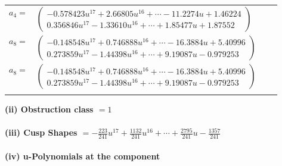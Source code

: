 \documentclass[1p]{elsarticle_modified}
\theoremstyle{definition}
\begin{document}
\begin{tabular}{m{7pt} m{180pt} m{7pt} m{180pt} }
\flushright $a_{4}=$&$\begin{pmatrix}-0.578423 u^{17}+2.66805 u^{16}+\cdots-11.2274 u+1.46224\\0.356846 u^{17}-1.33610 u^{16}+\cdots+1.85477 u+1.87552\end{pmatrix}$ \\
\flushright $a_{8}=$&$\begin{pmatrix}-0.148548 u^{17}+0.746888 u^{16}+\cdots-16.3884 u+5.40996\\0.273859 u^{17}-1.44398 u^{16}+\cdots+9.19087 u-0.979253\end{pmatrix}$\\ \flushright $a_{8}=$&$\begin{pmatrix}-0.148548 u^{17}+0.746888 u^{16}+\cdots-16.3884 u+5.40996\\0.273859 u^{17}-1.44398 u^{16}+\cdots+9.19087 u-0.979253\end{pmatrix}$\\&\end{tabular}
\flushleft \textbf{(ii) Obstruction class $= 1$}\\~\\
\flushleft \textbf{(iii) Cusp Shapes $= -\frac{223}{241} u^{17}+\frac{1132}{241} u^{16}+\cdots+\frac{2795}{241} u-\frac{1357}{241}$}\\~\\
\newpage\renewcommand{\arraystretch}{1}
\flushleft \textbf{(iv) u-Polynomials at the component}\newline \\
\end{document}
